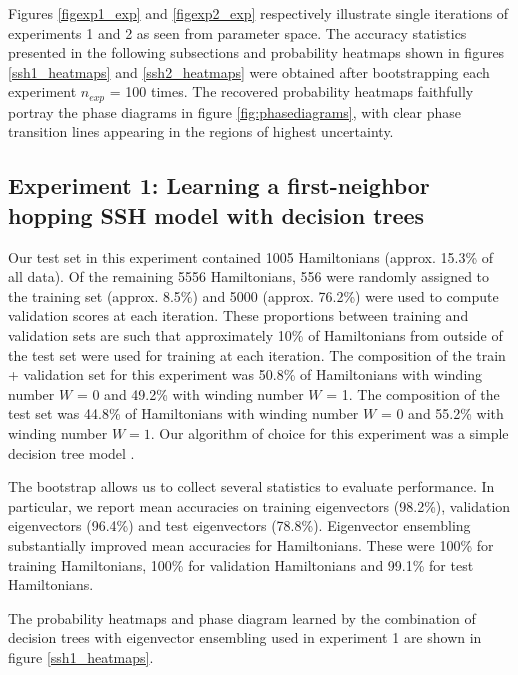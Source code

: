 \documentclass[fleqn,10pt]{wlscirep}
\begin{document}
Figures \ref{figexp1_exp} and \ref{figexp2_exp} respectively illustrate single iterations of experiments 1 and 2 as seen from parameter space. The accuracy statistics presented in the following subsections and probability heatmaps shown in figures \ref{ssh1_heatmaps} and \ref{ssh2_heatmaps} were obtained after bootstrapping each experiment $n_{exp}$ = 100 times. The recovered probability heatmaps faithfully portray the phase diagrams in figure \ref{fig:phasediagrams}, with clear phase transition lines appearing in the regions of highest uncertainty.

\subsection*{Experiment 1: Learning a first-neighbor hopping SSH model with decision trees}

Our test set in this experiment contained 1005 Hamiltonians (approx. 15.3\% of all data). Of the remaining 5556 Hamiltonians, 556 were randomly assigned to the training set (approx. 8.5\%) and 5000 (approx. 76.2\%) were used to compute validation scores at each iteration. These proportions between training and validation sets are such that approximately 10\%  of Hamiltonians from outside of the test set were used for training at each iteration. The composition of the train + validation set for this experiment was 50.8\% of Hamiltonians with winding number $W$ = 0 and 49.2\% with winding number $W$ = 1. The composition of the test set was 44.8\% of Hamiltonians with winding number $W$ = 0 and 55.2\% with winding number $W=1$. Our algorithm of choice for this experiment was a simple decision tree model \cite{breiman2017classification}.

The bootstrap allows us to collect several statistics to evaluate performance. In particular, we report mean accuracies on training eigenvectors (98.2\%), validation eigenvectors (96.4\%) and test eigenvectors (78.8\%). Eigenvector ensembling substantially improved mean accuracies for Hamiltonians. These were 100\% for training Hamiltonians, 100\% for validation Hamiltonians and 99.1\% for test Hamiltonians.

The probability heatmaps and phase diagram learned by the combination of decision trees with eigenvector ensembling used in experiment 1 are shown in figure \ref{ssh1_heatmaps}.
\end{document}
